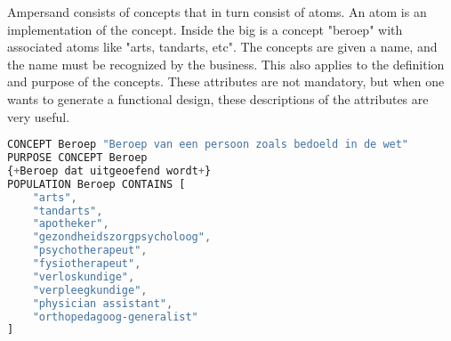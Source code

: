 Ampersand consists of concepts that in turn consist of atoms.
An atom is an implementation of the concept.
Inside the \acrshort{big} is a concept "beroep" with associated atoms like "arts, tandarts, etc".
The concepts are given a name, and the name must be recognized by the business.
This also applies to the definition and purpose of the concepts.
These attributes are not mandatory, but when one wants to generate a functional design, these descriptions of the attributes are very useful.
\begin{lstlisting}[language=Octave] 
CONCEPT Beroep "Beroep van een persoon zoals bedoeld in de wet" 
PURPOSE CONCEPT Beroep 
{+Beroep dat uitgeoefend wordt+}
POPULATION Beroep CONTAINS [
    "arts",
    "tandarts",
    "apotheker",
    "gezondheidszorgpsycholoog",
    "psychotherapeut",
    "fysiotherapeut",
    "verloskundige",
    "verpleegkundige",
    "physician assistant",
    "orthopedagoog-generalist"
]
\end{lstlisting}

